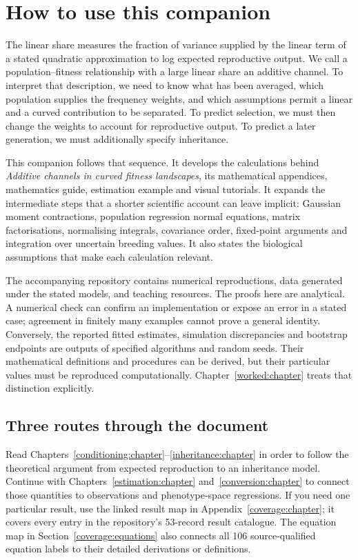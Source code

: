 \chapter*{How to use this companion}
\label{reading:map}

The linear share measures the fraction of variance supplied by the linear term of a stated quadratic approximation to log expected reproductive output. We call a population--fitness relationship with a large linear share an additive channel. To interpret that description, we need to know what has been averaged, which population supplies the frequency weights, and which assumptions permit a linear and a curved contribution to be separated. To predict selection, we must then change the weights to account for reproductive output. To predict a later generation, we must additionally specify inheritance.

This companion follows that sequence. It develops the calculations behind \emph{Additive channels in curved fitness landscapes}, its mathematical appendices, mathematics guide, estimation example and visual tutorials. It expands the intermediate steps that a shorter scientific account can leave implicit: Gaussian moment contractions, population regression normal equations, matrix factorisations, normalising integrals, covariance order, fixed-point arguments and integration over uncertain breeding values. It also states the biological assumptions that make each calculation relevant.

The accompanying repository contains numerical reproductions, data generated under the stated models, and teaching resources. The proofs here are analytical. A numerical check can confirm an implementation or expose an error in a stated case; agreement in finitely many examples cannot prove a general identity. Conversely, the reported fitted estimates, simulation discrepancies and bootstrap endpoints are outputs of specified algorithms and random seeds. Their mathematical definitions and procedures can be derived, but their particular values must be reproduced computationally. Chapter~\ref{worked:chapter} treats that distinction explicitly.

\section*{Three routes through the document}
Read Chapters~\ref{conditioning:chapter}--\ref{inheritance:chapter} in order to follow the theoretical argument from expected reproduction to an inheritance model. Continue with Chapters~\ref{estimation:chapter} and~\ref{conversion:chapter} to connect those quantities to observations and phenotype-space regressions. If you need one particular result, use the linked result map in Appendix~\ref{coverage:chapter}; it covers every entry in the repository's 53-record result catalogue. The equation map in Section~\ref{coverage:equations} also connects all 106 source-qualified equation labels to their detailed derivations or definitions.

